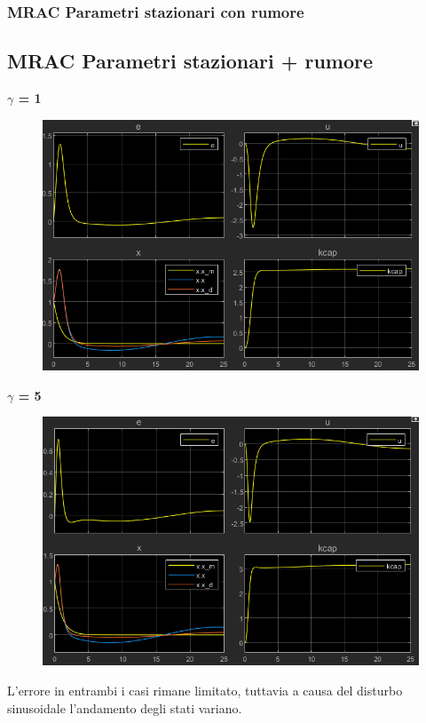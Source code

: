 \documentclass{beamer}
\begin{document}
\begin{frame}
	\frametitle{MRAC Parametri stazionari con rumore}
	\subsection{MRAC Parametri stazionari + rumore}
	\begin{minipage}[t]{0.45\textwidth}
		\textbf{\(\gamma\) = 1}
		\begin{figure}
			\includegraphics[scale=0.25]{2022-05-20-11-03-08.png} %
		\end{figure}
	\end{minipage}
	\begin{minipage}[t]{0.45\textwidth}
		\textbf{\(\gamma\) = 5}
		\begin{figure}
			\includegraphics[scale=0.25]{2022-05-20-11-04-01.png} %
		\end{figure}
	\end{minipage}
	\vspace{0.1cm}
	L'errore in entrambi i casi rimane limitato, tuttavia a causa del disturbo sinusoidale l'andamento degli stati variano.
\end{frame}
\end{document}
